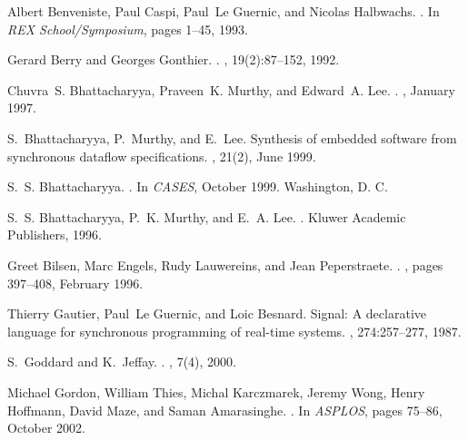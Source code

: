 \documentclass{sig-alt-full}
\begin{document}
%
{\small
\begin{thebibliography}{10}

Albert Benveniste, Paul Caspi, Paul~Le Guernic, and Nicolas Halbwachs.
.
\newblock In {\em {REX} School/Symposium}, pages 1--45, 1993.

Gerard Berry and Georges Gonthier.
.
, 19(2):87--152, 1992.

Chuvra~S. Bhattacharyya, Praveen~K. Murthy, and Edward~A. Lee.
.
, January
  1997.

S.~Bhattacharyya, P.~Murthy, and E.~Lee.
\newblock Synthesis of embedded software from synchronous dataflow
  specifications.
, 21(2), June 1999.

S.~S. Bhattacharyya.
.
\newblock In {\em CASES}, October 1999.
\newblock Washington, D. C.

S.~S. Bhattacharyya, P.~K. Murthy, and E.~A. Lee.
.
\newblock Kluwer Academic Publishers, 1996.

Greet Bilsen, Marc Engels, Rudy Lauwereins, and Jean Peperstraete.
.
, pages 397--408, February
  1996.

Thierry Gautier, Paul~Le Guernic, and Loic Besnard.
\newblock Signal: A declarative language for synchronous programming of
  real-time systems.
,
  274:257--277, 1987.

S.~Goddard and K.~Jeffay.
.
, 7(4), 2000.

Michael Gordon, William Thies, Michal Karczmarek, Jeremy Wong, Henry Hoffmann,
  David Maze, and Saman Amarasinghe.
.
\newblock In {\em ASPLOS}, pages 75--86, October 2002.


\end{thebibliography}}
\end{document}
